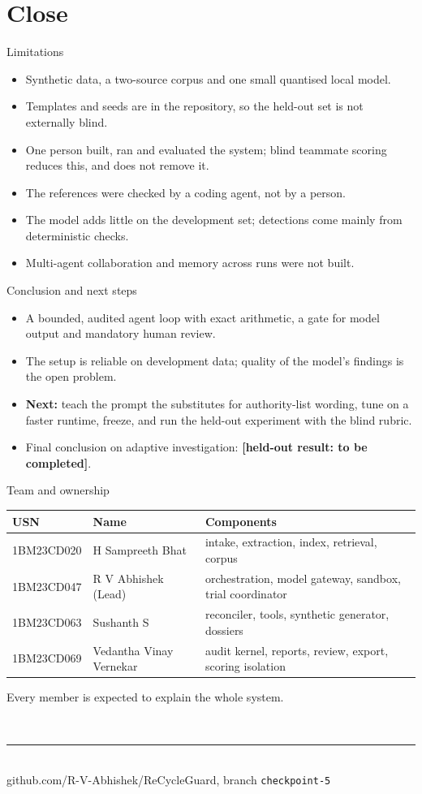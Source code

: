 \documentclass[aspectratio=169,10pt]{beamer}
\newcommand{\pending}[1]{{\color{pendingorange}\textbf{[#1: to be completed]}}}
\begin{document}
\section{Close}
\begin{frame}{Limitations}
\begin{itemize}
\item Synthetic data, a two-source corpus and one small quantised local model.
\item Templates and seeds are in the repository, so the held-out set is not externally blind.
\item One person built, ran and evaluated the system; blind teammate scoring reduces this, and does not remove it.
\item The references were checked by a coding agent, not by a person.
\item The model adds little on the development set; detections come mainly from deterministic checks.
\item Multi-agent collaboration and memory across runs were not built.
\end{itemize}
\end{frame}

\begin{frame}{Conclusion and next steps}
\begin{itemize}
\item A bounded, audited agent loop with exact arithmetic, a gate for model output and mandatory human review.
\item The setup is reliable on development data; quality of the model's findings is the open problem.
\item \textbf{Next:} teach the prompt the substitutes for authority-list wording, tune on a faster runtime, freeze, and run the held-out experiment with the blind rubric.
\item Final conclusion on adaptive investigation: \pending{held-out result}.
\end{itemize}
\end{frame}

\begin{frame}{Team and ownership}
\small
\begin{tabularx}{\linewidth}{@{}l l X@{}}
\toprule
\textbf{USN} & \textbf{Name} & \textbf{Components} \\ \midrule
1BM23CD020 & H Sampreeth Bhat & intake, extraction, index, retrieval, corpus \\
1BM23CD047 & R V Abhishek (Lead) & orchestration, model gateway, sandbox, trial coordinator \\
1BM23CD063 & Sushanth S & reconciler, tools, synthetic generator, dossiers \\
1BM23CD069 & Vedantha Vinay Vernekar & audit kernel, reports, review, export, scoring isolation \\
\bottomrule
\end{tabularx}

\medskip\small Every member is expected to explain the whole system.
\end{frame}

{
\begin{frame}[plain]
\centering\vfill
{\\[8pt]
{\color{gold}\rule{4cm}{1pt}}\\[8pt]
{\small github.com/R-V-Abhishek/ReCycleGuard, branch \texttt{checkpoint-5}}}
\vfill
\end{frame}}
\end{document}
